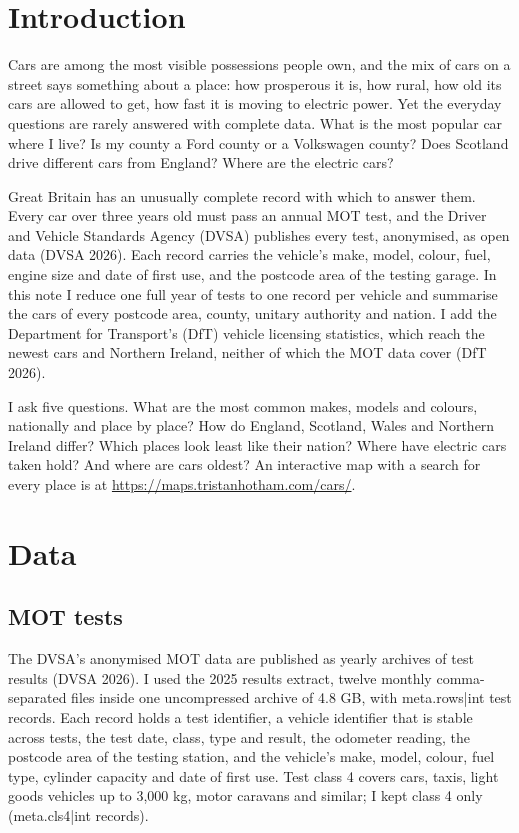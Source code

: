 \documentclass[11pt,a4paper]{article}
\begin{document}
\section{Introduction}

Cars are among the most visible possessions people own, and the mix of cars on a street says something about a place: how prosperous it is, how rural, how old its cars are allowed to get, how fast it is moving to electric power. Yet the everyday questions are rarely answered with complete data. What is the most popular car where I live? Is my county a Ford county or a Volkswagen county? Does Scotland drive different cars from England? Where are the electric cars?

Great Britain has an unusually complete record with which to answer them. Every car over three years old must pass an annual MOT test, and the Driver and Vehicle Standards Agency (DVSA) publishes every test, anonymised, as open data (DVSA 2026). Each record carries the vehicle's make, model, colour, fuel, engine size and date of first use, and the postcode area of the testing garage. In this note I reduce one full year of tests to one record per vehicle and summarise the cars of every postcode area, county, unitary authority and nation. I add the Department for Transport's (DfT) vehicle licensing statistics, which reach the newest cars and Northern Ireland, neither of which the MOT data cover (DfT 2026).

I ask five questions. What are the most common makes, models and colours, nationally and place by place? How do England, Scotland, Wales and Northern Ireland differ? Which places look least like their nation? Where have electric cars taken hold? And where are cars oldest? An interactive map with a search for every place is at \url{https://maps.tristanhotham.com/cars/}.

\section{Data}

\subsection{MOT tests}

The DVSA's anonymised MOT data are published as yearly archives of test results (DVSA 2026). I used the 2025 results extract, twelve monthly comma-separated files inside one uncompressed archive of 4.8 GB, with {{meta.rows|int}} test records. Each record holds a test identifier, a vehicle identifier that is stable across tests, the test date, class, type and result, the odometer reading, the postcode area of the testing station, and the vehicle's make, model, colour, fuel type, cylinder capacity and date of first use. Test class 4 covers cars, taxis, light goods vehicles up to 3,000 kg, motor caravans and similar; I kept class 4 only ({{meta.cls4|int}} records).
\end{document}
